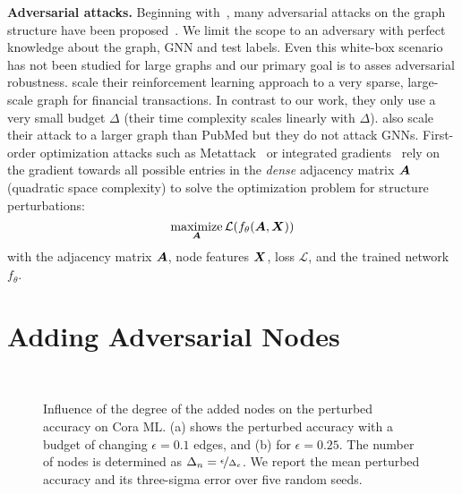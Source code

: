 \documentclass[letterpaper]{article} %
\newcommand{\adj}{\mA}
\newcommand{\features}{\mX}
\DeclareMathOperator*{\maximize}{maximize}
\begin{document}
\textbf{Adversarial attacks.} Beginning with~\citep{Dai2018, Zugner2018}, many adversarial attacks on the graph structure have been proposed~\citep{Zugner2019a, Xu2019a, Bojchevski2019, Wu2019, Wang2019, Tang2020}. We limit the scope to an adversary with perfect knowledge about the graph, GNN and test labels. Even this white-box scenario has not been studied for large graphs and our primary goal is to asses adversarial robustness.
\citet{Dai2018} scale their reinforcement learning approach to a very sparse, large-scale graph for financial transactions. In contrast to our work, they only use a very small budget \(\Delta\) (their time complexity scales linearly with \(\Delta\)). \citet{Wang2019} also scale their attack to a larger graph than PubMed but they do not attack GNNs. First-order optimization attacks such as Metattack~\citep{Zugner2019a} or integrated gradients~\citep{Wu2019} rely on the gradient towards all possible entries in the \textit{dense} adjacency matrix \(\adj\) (quadratic space complexity) to solve the optimization problem for structure perturbations:
\begin{equation}\label{eq:attack}
    \maximize_{\adj} \mathcal{L}(f_{\theta}(\adj, \features))
\end{equation}
with the adjacency matrix \(\adj\), node features \(\features\), loss \(\mathcal{L}\), and the trained network \(f_{\theta}\).

\section{Adding Adversarial Nodes}\label{sec:attackkdd}

\begin{figure}[t]
  \centering
  \hbox{\hspace{45pt} \resizebox{0.7\linewidth}{!}{}}
  \vspace{-14pt}
  \caption{Influence of the degree of the added nodes on the perturbed accuracy on Cora ML. (a) shows the perturbed accuracy with a budget of changing \(\epsilon=0.1\) edges, and (b) for \(\epsilon=0.25\). The number of nodes is determined as \(\Delta_n = \nicefrac{\epsilon}{\Delta_e}\). We report the mean perturbed accuracy and its three-sigma error over five random seeds. \label{fig:gangnodeeffectiveness}}
\end{figure}
\end{document}
